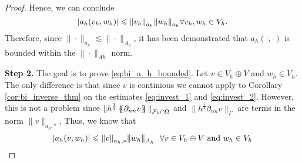 \begin{proof}
             Hence, we can conclude \begin{equation}
                 \label{eq:ah_ahnorm}
                 \left\lvert  a_{h}( v_{h},w_{h})   \right\rvert \leqslant \| v_{h} \|_{ a_{h} }^{  } \| w_{h} \|_{ a_{h} }^{  } \forall v_{h},w_{h} \in V_{h}.
             \end{equation}
             Therefore, since $\| \cdot  \|_{a_{h}  }^{  } \lesssim  \| \cdot  \|_{A_{h}  }^{  } $, it has been demonstrated that $a_{h}( \cdot ,\cdot )$ is bounded within the $\|\cdot   \|_{A{h} }^{ }$ norm.

             \textbf{Step 2.} The goal is to prove \eqref{eq:bi_a_h_bounded}. Let $v \in V_{h} \oplus V $ and $w_{h} \in V_{h}$.
             The only difference is that since $v$ is continious we cannot apply to Corollary \ref{cor:bi_inverse_thm} on the estimates \eqref{eq:invest_1} and \eqref{eq:invest_2}. However, this is not a problem since $\| h^{\frac{1}{2}} \left\{\!\!\left\{ \partial _{nn} v \right\}\!\!\right\}
             \|_{\mathcal{F} _{h}\cap  \Omega   }^{  } $ and  $\|h^{\frac{1}{2}}  \partial _{nn}v \|_{\Gamma   }^{  } $ are terms in the norm $\|  v \|_{a_{h},*  }^{  } $. Thus, we know that
             \begin{equation}
                  \left\lvert  a_{h}( v,w_{h})  \right\rvert  \leqslant \| v \|_{ a_{h},* }^{  } \| w_{h} \|_{ A_{h} }^{  } \ \ \forall v \in V_{h} \oplus V \text{ and } w_{h} \in V_{h}
             \end{equation}

\end{proof}




